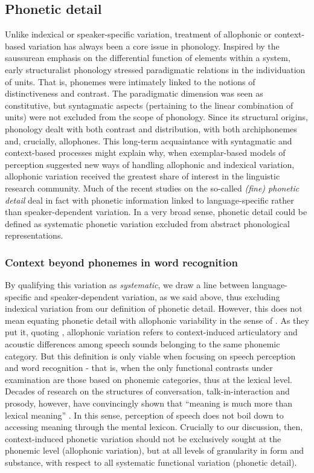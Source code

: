 \subsection{Phonetic detail}\label{sec112}
Unlike indexical or speaker-specific variation, treatment of allophonic or context-based variation has always been a core issue in phonology. Inspired by the saussurean emphasis on the differential function of elements within a system, early structuralist phonology stressed paradigmatic relations in the individuation of units. That is, phonemes were intimately linked to the notions of distinctiveness and contrast. The paradigmatic dimension was seen as constitutive, but syntagmatic aspects (pertaining to the linear combination of units) were not excluded from the scope of phonology. Since its structural origins, phonology dealt with both contrast and distribution, with both archiphonemes and, crucially, allophones. This long-term acquaintance with syntagmatic and context-based processes might explain why, when exemplar-based models of perception suggested new ways of handling allophonic and indexical variation, allophonic variation received the greatest share of interest in the linguistic research community. Much of the recent studies on the so-called \textit{(fine) phonetic detail} deal in fact with phonetic information linked to language-specific rather than speaker-dependent variation. In a very broad sense, phonetic detail could be defined as systematic phonetic variation excluded from abstract phonological representations. 

\subsubsection{Context beyond phonemes in word recognition}\label{sec1121}
By qualifying this variation as \textit{systematic}, we draw a line between language-specific and speaker-dependent variation, as we said above, thus excluding indexical variation from our definition of phonetic detail. However, this does not mean equating phonetic detail with allophonic variability in the sense of \citet{luce2003abstractness}. As they put it, quoting \citet{ladefoged2000course}, allophonic variation refers to context-induced articulatory and acoustic differences among speech sounds belonging to the same phonemic category. But this definition is only viable when focusing on speech perception and word recognition - that is, when the only functional contrasts under examination are those based on phonemic categories, thus at the lexical level. Decades of research on the structures of conversation, talk-in-interaction and prosody, however, have convincingly shown that ``meaning is much more than lexical meaning'' \citep{local2003variable}. In this sense, perception of speech does not boil down to accessing meaning through the mental lexicon. Crucially to our discussion, then, context-induced phonetic variation should not be exclusively sought at the phonemic level (allophonic variation), but at all levels of granularity in form and substance, with respect to all systematic functional variation (phonetic detail). 

